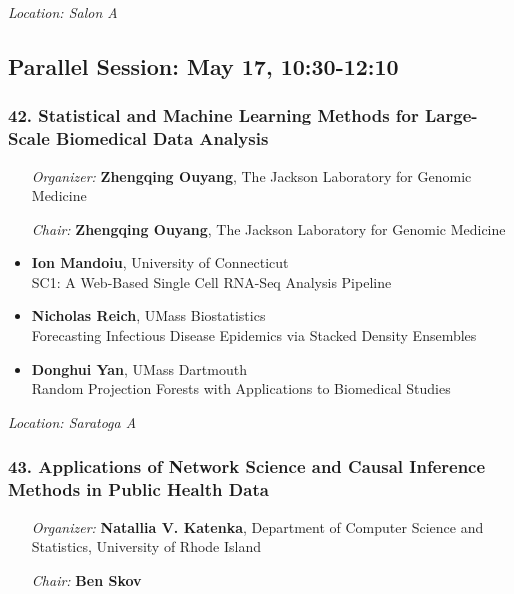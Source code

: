 \emph{Location: Salon A}

\subsection*{Parallel Session: May 17, 10:30-12:10}

\subsubsection*{42. Statistical and Machine Learning Methods for Large-Scale Biomedical Data Analysis}

\begin{enumerate}[align=left]
\item [\emph{Organizer:}] \textbf{Zhengqing Ouyang}, The Jackson Laboratory for Genomic Medicine
\item [\emph{Chair:}] \textbf{Zhengqing Ouyang}, The Jackson Laboratory for Genomic Medicine
\end{enumerate}

\begin{itemize}
\item \textbf{Ion Mandoiu}, University of Connecticut \\
SC1: A Web-Based Single Cell RNA-Seq Analysis Pipeline
\item \textbf{Nicholas Reich}, UMass Biostatistics \\
Forecasting Infectious Disease Epidemics via Stacked Density Ensembles
\item \textbf{Donghui Yan}, UMass Dartmouth \\
Random Projection Forests with Applications to Biomedical Studies
\end{itemize}

\emph{Location: Saratoga A}

\subsubsection*{43. Applications of Network Science and Causal Inference Methods in Public Health Data}

\begin{enumerate}[align=left]
\item [\emph{Organizer:}] \textbf{Natallia V. Katenka}, Department of Computer Science and Statistics, University of Rhode Island
\item [\emph{Chair:}] \textbf{Ben Skov}
\end{enumerate}


